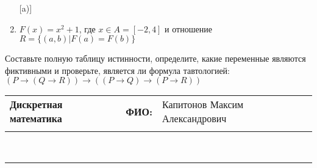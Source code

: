 \documentclass[10pt]{exam}
\newcommand{\class}{Дискретная математика}
\newcommand{\examdate}{}
\begin{document}
\begin{questions}
\begin{enumerate} [a)]
\item $F(x)=x^{2}+1$, где $x \in A = [-2, 4]$ и отношение $R = \{(a,b)|F(a) = F(b)\}$
\end{enumerate}\question Составьте полную таблицу истинности, определите, какие переменные являются фиктивными и проверьте, является ли формула тавтологией:
$(P \rightarrow (Q \rightarrow R)) \rightarrow ((P \rightarrow Q) \rightarrow (P \rightarrow R))$

\end{questions}
\newpage
\begin{flushright}
\begin{tabular}{p{2.8in} r l}
\textbf{\class} & \textbf{ФИО:} &Капитонов Максим Александрович
\\

\textbf{\examdate} &&\\
\end{tabular}\\
\end{flushright}
\rule[1ex]{\textwidth}{.1pt}
\end{document}
